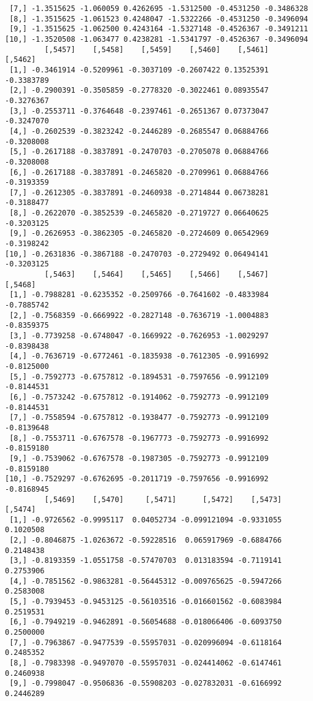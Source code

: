 \documentclass[
  letterpaper,
  DIV=11,
  numbers=noendperiod]{scrreprt}
\begin{document}
\begin{verbatim}
 [7,] -1.3515625 -1.060059 0.4262695 -1.5312500 -0.4531250 -0.3486328
 [8,] -1.3515625 -1.061523 0.4248047 -1.5322266 -0.4531250 -0.3496094
 [9,] -1.3515625 -1.062500 0.4243164 -1.5327148 -0.4526367 -0.3491211
[10,] -1.3520508 -1.063477 0.4238281 -1.5341797 -0.4526367 -0.3496094
         [,5457]    [,5458]    [,5459]    [,5460]    [,5461]    [,5462]
 [1,] -0.3461914 -0.5209961 -0.3037109 -0.2607422 0.13525391 -0.3383789
 [2,] -0.2900391 -0.3505859 -0.2778320 -0.3022461 0.08935547 -0.3276367
 [3,] -0.2553711 -0.3764648 -0.2397461 -0.2651367 0.07373047 -0.3247070
 [4,] -0.2602539 -0.3823242 -0.2446289 -0.2685547 0.06884766 -0.3208008
 [5,] -0.2617188 -0.3837891 -0.2470703 -0.2705078 0.06884766 -0.3208008
 [6,] -0.2617188 -0.3837891 -0.2465820 -0.2709961 0.06884766 -0.3193359
 [7,] -0.2612305 -0.3837891 -0.2460938 -0.2714844 0.06738281 -0.3188477
 [8,] -0.2622070 -0.3852539 -0.2465820 -0.2719727 0.06640625 -0.3203125
 [9,] -0.2626953 -0.3862305 -0.2465820 -0.2724609 0.06542969 -0.3198242
[10,] -0.2631836 -0.3867188 -0.2470703 -0.2729492 0.06494141 -0.3203125
         [,5463]    [,5464]    [,5465]    [,5466]    [,5467]    [,5468]
 [1,] -0.7988281 -0.6235352 -0.2509766 -0.7641602 -0.4833984 -0.7885742
 [2,] -0.7568359 -0.6669922 -0.2827148 -0.7636719 -1.0004883 -0.8359375
 [3,] -0.7739258 -0.6748047 -0.1669922 -0.7626953 -1.0029297 -0.8398438
 [4,] -0.7636719 -0.6772461 -0.1835938 -0.7612305 -0.9916992 -0.8125000
 [5,] -0.7592773 -0.6757812 -0.1894531 -0.7597656 -0.9912109 -0.8144531
 [6,] -0.7573242 -0.6757812 -0.1914062 -0.7592773 -0.9912109 -0.8144531
 [7,] -0.7558594 -0.6757812 -0.1938477 -0.7592773 -0.9912109 -0.8139648
 [8,] -0.7553711 -0.6767578 -0.1967773 -0.7592773 -0.9916992 -0.8159180
 [9,] -0.7539062 -0.6767578 -0.1987305 -0.7592773 -0.9912109 -0.8159180
[10,] -0.7529297 -0.6762695 -0.2011719 -0.7597656 -0.9916992 -0.8168945
         [,5469]    [,5470]     [,5471]      [,5472]    [,5473]   [,5474]
 [1,] -0.9726562 -0.9995117  0.04052734 -0.099121094 -0.9331055 0.1020508
 [2,] -0.8046875 -1.0263672 -0.59228516  0.065917969 -0.6884766 0.2148438
 [3,] -0.8193359 -1.0551758 -0.57470703  0.013183594 -0.7119141 0.2753906
 [4,] -0.7851562 -0.9863281 -0.56445312 -0.009765625 -0.5947266 0.2583008
 [5,] -0.7939453 -0.9453125 -0.56103516 -0.016601562 -0.6083984 0.2519531
 [6,] -0.7949219 -0.9462891 -0.56054688 -0.018066406 -0.6093750 0.2500000
 [7,] -0.7963867 -0.9477539 -0.55957031 -0.020996094 -0.6118164 0.2485352
 [8,] -0.7983398 -0.9497070 -0.55957031 -0.024414062 -0.6147461 0.2460938
 [9,] -0.7998047 -0.9506836 -0.55908203 -0.027832031 -0.6166992 0.2446289

\end{verbatim}
\end{document}
